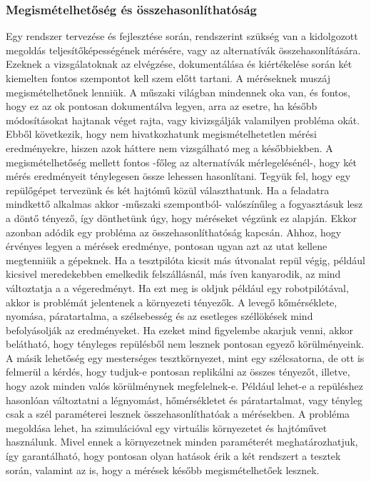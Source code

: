         \subsubsection{Megismételhetőség és összehasonlíthatóság}
        Egy rendszer tervezése és fejlesztése során, rendszerint szükség van a kidolgozott megoldás teljesítőképességének mérésére, vagy az alternatívák összehasonlítására.
        Ezeknek a vizsgálatoknak az elvégzése, dokumentálása és kiértékelése során két kiemelten fontos szempontot kell szem előtt tartani.
        A méréseknek muszáj megismételhetőnek lenniük. A műszaki világban mindennek oka van, és fontos, hogy ez az ok pontosan dokumentálva legyen, arra az esetre, ha később módosításokat hajtanak véget rajta, vagy kivizsgálják valamilyen probléma okát.
        Ebből következik, hogy nem hivatkozhatunk megismételhetetlen mérési eredményekre, hiszen azok háttere nem vizsgálható meg a későbbiekben.
        A megismételhetőség mellett fontos -főleg az alternatívák mérlegelésénél-, hogy két mérés eredményeit ténylegesen össze lehessen hasonlítani. Tegyük fel, hogy egy repülőgépet tervezünk és két hajtómű közül választhatunk. Ha a feladatra mindkettő alkalmas akkor -műszaki szempontból- valószínűleg a fogyasztásuk lesz a döntő tényező, így dönthetünk úgy, hogy méréseket végzünk ez alapján.
        Ekkor azonban adódik egy probléma az összehasonlíthatóság kapcsán. Ahhoz, hogy érvényes legyen a mérések eredménye, pontosan ugyan azt az utat kellene megtenniük a gépeknek. Ha a tesztpilóta kicsit más útvonalat repül végig, például kicsivel meredekebben emelkedik felszállásnál, más íven kanyarodik, az mind változtatja a a végeredményt.
        Ha ezt meg is oldjuk például egy robotpilótával, akkor is problémát jelentenek a környezeti tényezők. A levegő kőmérséklete, nyomása, páratartalma, a szélsebesség és az esetleges széllökések mind befolyásolják az eredményeket.
        Ha ezeket mind figyelembe akarjuk venni, akkor belátható, hogy tényleges repülésből nem lesznek pontosan egyező körülményeink.
        A másik lehetőség egy mesterséges tesztkörnyezet, mint egy szélcsatorna, de ott is felmerül a kérdés, hogy tudjuk-e pontosan replikálni az összes tényezőt, illetve, hogy azok minden valós körülménynek megfelelnek-e. Például lehet-e a repüléshez hasonlóan változtatni a légnyomást, hőmérsékletet és páratartalmat, vagy tényleg csak a szél paraméterei lesznek összehasonlíthatóak a mérésekben.
        A probléma megoldása lehet, ha szimulációval egy virtuális környezetet és hajtóművet használunk. Mivel ennek a környezetnek minden paraméterét meghatározhatjuk, így garantálható, hogy pontosan olyan hatások érik a két rendszert a tesztek során, valamint az is, hogy a mérések később megismételhetőek lesznek.

